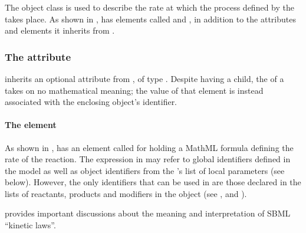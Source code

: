 \subsubsection{}
\label{subsec:kinetic-law}
\label{subsec:listoflocalparameters}

The \KineticLaw object class is used to describe the rate at which
the process defined by the \Reaction takes place.  As shown in
, \KineticLaw has elements called
 and , in addition to the
attributes and elements it inherits from \SBase.


\begin{blockChanged}
\subsubsection{The  attribute}
\label{sec:kineticlaw-id}

\KineticLaw inherits an optional  attribute from \SBase, of type .  Despite having a  child, the  of a \KineticLaw takes on no mathematical meaning; the value of that  element is instead associated with the enclosing \Reaction object's identifier.
\end{blockChanged}


\paragraph{The  element}

As shown in , \KineticLaw has an element
called  for holding a MathML formula defining the rate
of the reaction.  The expression in  may refer to
global identifiers defined in the model as well as \LocalParameter object
identifiers from the \KineticLaw's list of local parameters (see
below).  However, the only \Species identifiers that can be used
in  are those declared in the lists of reactants,
products and modifiers in the \Reaction object (see
,
 and ).

 provides important
discussions about the meaning and interpretation of SBML ``kinetic
laws''.



